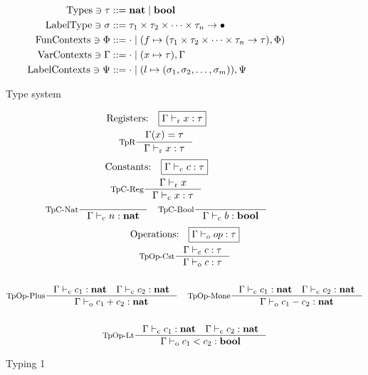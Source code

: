 \documentclass[a4paper, oneside, 10pt, draft]{memoir}
\begin{document}
\begin{figure}
  \begin{align*}
    \mathrm{Types} \ni \tau & ::= \mathbf{nat} \; \vert \; \mathbf{bool} \\
    \mathrm{Label Type} \ni \sigma   & ::= \tau_1 \times \tau_2 \times \dotsb \times \tau_n -> \bullet\\
    \mathrm{Fun Contexts} \ni \Phi & ::= \cdot \; \vert \; (f \mapsto (\tau_1 \times \tau_2 \times \dotsb \times \tau_n -> \tau), \Phi) \\
    \mathrm{Var Contexts} \ni \Gamma & ::= \cdot \; \vert \; (x \mapsto \tau),\Gamma\\
    \mathrm{Label Contexts} \ni \Psi   & ::= \cdot \; \vert \; (l \mapsto (\sigma_1, \sigma_2, \dotsc, \sigma_m)),\Psi
  \end{align*}
  \caption{Type system}
  \label{fig:type-system}
\end{figure}

\newcommand{\tpr}{|-_{\mathrm{r}}}
\newcommand{\tpc}{|-_{\mathrm{c}}}
\newcommand{\tpop}{|-_{\mathrm{o}}}
\newcommand{\tpb}{|-_{\mathrm{b}}}

\begin{figure}
  \begin{gather*}
    \text{Registers:} \quad \boxed{\Gamma \tpr x : \tau}\\
    \inference[TpR]{\Gamma(x) = \tau}{\Gamma \tpr x : \tau}
  \end{gather*}
  \begin{gather*}
    \text{Constants:} \quad \boxed{\Gamma \tpc c : \tau}\\
    \inference[TpC-Reg]{\Gamma \tpr x}{\Gamma \tpc x : \tau}\\
    \inference[TpC-Nat]{}{\Gamma \tpc n : \tnat} \quad
    \inference[TpC-Bool]{}{\Gamma \tpc b : \tbool}
  \end{gather*}
  \begin{gather*}
    \text{Operations:} \quad \boxed{\Gamma \tpop op : \tau} \\
    \inference[TpOp-Cst]{\Gamma \tpc c : \tau}{\Gamma \tpop c : \tau}\\\\
    \inference[TpOp-Plus]{\Gamma \tpc c_1 : \tnat \quad \Gamma
      \tpc c_2 : \tnat}{\Gamma \tpop c_1 + c_2 : \tnat} \quad
    \inference[TpOp-Mone]{\Gamma \tpc c_1 : \tnat \quad \Gamma
      \tpc c_2 : \tnat}{\Gamma \tpop c_1 - c_2 : \tnat}\\\\
    \inference[TpOp-Lt]{\Gamma \tpc c_1 : \tnat \quad \Gamma
      \tpc c_2 : \tnat}{\Gamma \tpop c_1 < c_2 : \tbool}
  \end{gather*}
  \caption{Typing 1}
  \label{fig:type-judgement-1}
\end{figure}
\end{document}
